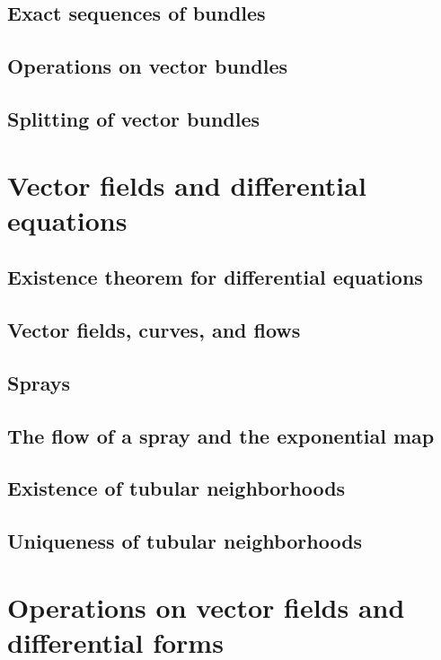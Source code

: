 \documentclass[a4paper]{article}
\begin{document}
\subsection{Exact sequences of bundles}

\subsection{Operations on vector bundles}

\subsection{Splitting of vector bundles}

\section{Vector fields and differential equations}

\subsection{Existence theorem for differential equations}

\subsection{Vector fields, curves, and flows}

\subsection{Sprays}

\subsection{The flow of a spray and the exponential map}

\subsection{Existence of tubular neighborhoods}

\subsection{Uniqueness of tubular neighborhoods}

\section{Operations on vector fields and differential forms}
\end{document}
